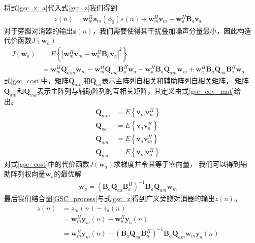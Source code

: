 \documentclass[master]{thesis-uestc}
\begin{document}
将式\eqref{gsc_z_a}代入式\eqref{gsc_z}我们得到
\begin{equation}\label{gsc_out}
    \begin{aligned}
        z(n) = \bm{w}^H_m\bm{a}_m(\phi_0)s(n) + \bm{w}^H_m\bm{v}_m - \bm{w}_a^H\bm{B}_a\bm{v}_a
    \end{aligned}
\end{equation}
对于旁瓣对消器的输出$\bm{z}(n)$，我们需要使得其干扰叠加噪声分量最小，因此构造代价函数$J(\bm{w}_a)$
\begin{equation}\label{gsc_cost}
    \begin{aligned}
        J(\bm{w}_a) &= E\left\{\left|\bm{w}^H_m\bm{v}_m - \bm{w}^H_a\bm{B}_a\bm{v}_a\right|^2\right\}
        \\
                    &= \bm{w}_m^H\bm{Q}_{mm}\bm{w}_m - \bm{w}_m^H\bm{Q}_{ma}\bm{B}_a^H\bm{w}_a -
                       \bm{w}_a^H\bm{B}_a\bm{Q}_{am}\bm{w}_m +
                       \bm{w}_a^H\bm{B}_a\bm{Q}_{aa}\bm{B}_a^H\bm{w}_a
    \end{aligned}
\end{equation}
式\eqref{gsc_cost}中，矩阵$\bm{Q}_{mm}$和$\bm{Q}_{aa}$表示主阵列自相关和辅助阵列自相关矩阵，
矩阵$\bm{Q}_{am}$和$\bm{Q}_{ma}$表示主阵列与辅助阵列的互相关矩阵，其定义由式\eqref{gsc_cov_mat}给出。
\begin{subequations}\label{gsc_cov_mat}
    \begin{align}
        \bm{Q}_{mm} &= E\left\{\bm{v}_m\bm{v}_m^H\right\}
        \\
        \bm{Q}_{aa} &= E\left\{\bm{v}_a\bm{v}_a^H\right\}
        \\
        \bm{Q}_{am} &= E\left\{\bm{v}_a\bm{v}_m^H\right\}
        \\
        \bm{Q}_{ma} &= E\left\{\bm{v}_m\bm{v}_a^H\right\}
    \end{align}
\end{subequations}
对式\eqref{gsc_cost}中的代价函数$J(\bm{w}_a)$求梯度并令其等于零向量，
我们可以得到辅助阵列权向量$\bm{w}_a$的最优解
\begin{equation}\label{gsc_w_a}
    \begin{aligned}
        \bm{w}_a = \left(\bm{B}_a\bm{Q}_{aa}\bm{B}_a^H\right)^{-1}\bm{B}_a\bm{Q}_{am}\bm{w}_m
    \end{aligned}
\end{equation}
最后我们结合图\ref{GSC_process}与式\eqref{gsc_z}得到广义旁瓣对消器的输出$z(n)$。
\begin{equation}\label{gsc_fin_out}
    \begin{aligned}
        z(n) &= z_m(n) - z_a(n) \\
             &= \bm{w}^H_m\bm{y}_m(n) - \bm{w}^H_a\bm{y}_a(n) \\
             &= \bm{w}^H_m\bm{y}_m(n) - 
                \left(\bm{B}_a\bm{Q}_{aa}\bm{B}_a^H\right)^{-1}\bm{B}_a\bm{Q}_{am}\bm{w}_m\bm{y}_a(n)
    \end{aligned}
\end{equation}
\end{document}
